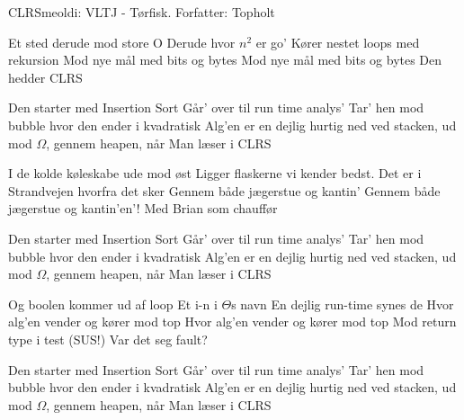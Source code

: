 \begin{sang}{CLRS}{meoldi: VLTJ - Tørfisk. Forfatter: Topholt}
    \begin{vers}
    Et sted derude mod store O
    Derude hvor $n^2$ er go'
    Kører nestet loops med rekursion
    Mod nye mål med bits og bytes
    Mod nye mål med bits og bytes
    Den hedder CLRS
    \end{vers}
    
    \begin{omkvaed}
    Den starter med Insertion Sort
    Går' over til run time analys' 
    Tar' hen mod bubble hvor den ender i kvadratisk
    Alg'en er en dejlig hurtig ned ved stacken, ud mod $\Omega$, gennem heapen, når
    Man læser i CLRS
    \end{omkvaed}
    
    \begin{vers}
    I de kolde køleskabe ude mod øst
    Ligger flaskerne vi kender bedst.
    Det er i Strandvejen hvorfra det sker
    Gennem både jægerstue og kantin'
    Gennem både jægerstue og kantin'en'!
    Med Brian som chauffør
    \end{vers}
    
    \begin{omkvaed}
    Den starter med Insertion Sort
    Går' over til run time analys' 
    Tar' hen mod bubble hvor den ender i kvadratisk
    Alg'en er en dejlig hurtig ned ved stacken, ud mod $\Omega$, gennem heapen, når
    Man læser i CLRS
    \end{omkvaed}
    
    \begin{vers}
    Og boolen kommer ud af loop
    Et i-n i $\Theta$s navn
    En dejlig run-time synes de
    Hvor alg'en vender og kører mod top
    Hvor alg'en vender og kører mod top
    Mod return type i test (SUS!)
    Var det seg fault?
    \end{vers}
    
    \begin{omkvaed}
    Den starter med Insertion Sort
    Går' over til run time analys' 
    Tar' hen mod bubble hvor den ender i kvadratisk
    Alg'en er en dejlig hurtig ned ved stacken, ud mod $\Omega$, gennem heapen, når
    Man læser i CLRS
    \end{omkvaed}
    \end{sang}